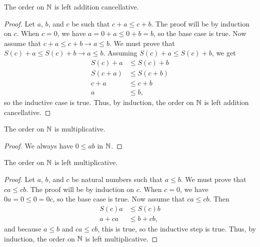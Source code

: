 \documentclass[../math.tex]{subfiles}
\begin{document}
\begin{instance}
    The order on $\mathbb{N}$ is left addition cancellative.
\end{instance}
\begin{proof}
    Let $a$, $b$, and $c$ be such that $c + a \leq c + b$.  The proof will be by
    induction on $c$.  When $c = 0$, we have $a = 0 + a \leq 0 + b = b$, so the
    base case is true.  Now assume that $c + a \leq c + b \rightarrow a \leq b$.
    We must prove that $S(c) + a \leq S(c) + b \rightarrow a \leq b$.  Assuming
    $S(c) + a \leq S(c) + b$, we get
    \begin{align*}
        S(c) + a &\leq S(c) + b \\
        S(c + a) &\leq S(c + b) \\
        c + a &\leq c + b \\
        a &\leq b,
    \end{align*}
    so the inductive case is true.  Thus, by induction, the order on $\mathbb{N}$ is
    left addition cancellative.
\end{proof}

\begin{instance}
    The order on $\mathbb{N}$ is multiplicative.
\end{instance}
\begin{proof}
    We always have $0 \leq ab$ in $\mathbb{N}$.
\end{proof}

\begin{instance}
    The order on $\mathbb{N}$ is left multiplicative.
\end{instance}
\begin{proof}
    Let $a$, $b$, and $c$ be natural numbers such that $a \leq b$.  We must
    prove that $ca \leq cb$.  The proof will be by induction on $c$.  When
    $c = 0$, we have $0a = 0 \leq 0 = 0c$, so the base case is true.  Now
    assume that $ca \leq cb$.  Then
    \begin{align*}
        S(c)a &\leq S(c)b \\
        a + ca &\leq b + cb,
    \end{align*}
    and because $a \leq b$ and $ca \leq cb$, this is true, so the inductive step
    is true.  Thus, by induction, the order on $\mathbb{N}$ is left multiplicative.
\end{proof}
\end{document}
